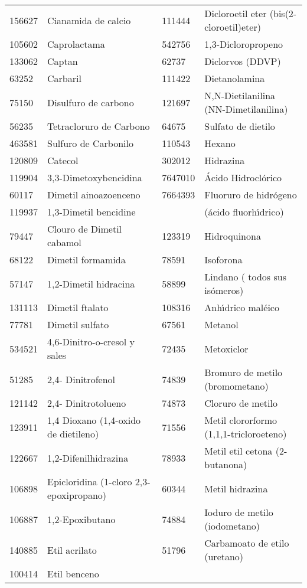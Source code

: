 \begin{table}[htdp]
\begin{scriptsize}
\begin{supertabular}{| p{0.10\textwidth}p{0.35\textwidth}p{0.10\textwidth}p{0.35\textwidth} |}
156627 & Cianamida de calcio &111444&Dicloroetil eter (bis(2-cloroetil)eter)\\
105602& Caprolactama& 542756 &1,3-Dicloropropeno\\ 
133062 & Captan & 62737 & Diclorvos (DDVP)\\
63252 & Carbaril &111422& Dietanolamina\\
75150 & Disulfuro de carbono & 121697 & N,N-Dietilanilina (NN-Dimetilanilina) \\
56235 & Tetracloruro de Carbono &64675&Sulfato de dietilo\\
463581 & Sulfuro de Carbonilo  &110543&Hexano\\
120809 & Catecol & 302012&Hidrazina \\
119904 & 3,3-Dimetoxybencidina &7647010&  \'Acido Hidrocl\'orico\\
60117 & Dimetil ainoazoenceno&7664393& Fluoruro de hidr\'ogeno\\
119937 & 1,3-Dimetil bencidine & &(\'acido fluorh\'{\i}drico)\\
79447 & Clouro de Dimetil cabamol&123319&Hidroquinona\\
  68122 & Dimetil formamida &78591&Isoforona\\
  57147 & 1,2-Dimetil hidracina & 58899&Lindano ( todos sus is\'omeros) \\
  131113&  Dimetil ftalato &108316&Anh\'{\i}drico mal\'eico \\
  77781 &Dimetil sulfato &67561&Metanol \\
  534521& 4,6-Dinitro-o-cresol y sales & 72435&Metoxiclor \\
  51285 & 2,4- Dinitrofenol & 74839 & Bromuro de metilo (bromometano)\\
  121142 & 2,4- Dinitrotolueno & 74873& Cloruro de metilo \\
  123911 & 1,4 Dioxano (1,4-oxido de dietileno) &71556&Metil clororformo (1,1,1-tricloroeteno)\\
  122667 & 1,2-Difenilhidrazina &78933&Metil etil cetona (2-butanona) \\
  106898 & Epicloridina (1-cloro 2,3-epoxipropano)&60344 &Metil hidrazina\\
  106887 & 1,2-Epoxibutano &74884&Ioduro de metilo (iodometano)\\
  140885 & Etil acrilato &51796 &Carbamoato de etilo (uretano) \\
  100414 & Etil benceno &  &\\\hline
\end{supertabular}
\end{scriptsize}
\label{airtox}
\end{table}%


